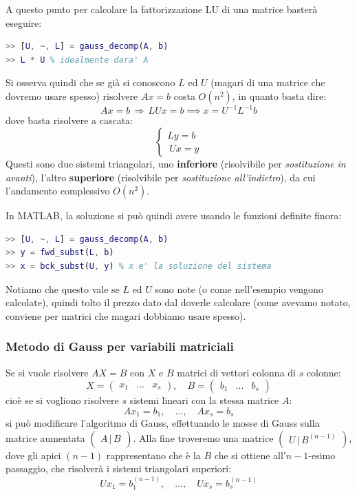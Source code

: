 \documentclass[a4paper,11pt]{article}
\begin{document}
A questo punto per calcolare la fattorizzazione LU di una matrice basterà eseguire:
\begin{lstlisting}[language=matlab, style=codestyle]	
>> [U, ~, L] = gauss_decomp(A, b)
>> L * U % idealmente dara' A
\end{lstlisting}
\par\smallskip

Si osserva quindi che se già si conoscono $L$ ed $U$ (magari di una matrice che dovremo usare spesso) risolvere $Ax = b$ costa $O(n^2)$, in quanto basta dire:
$$
Ax = b \, \Rightarrow \, LUx = b \implies x = U^{-1} L^{-1} b
$$
dove basta risolvere a cascata:
\[
	\begin{cases}
		Ly = b \\\
		Ux = y
	\end{cases}
\]
Questi sono due sistemi triangolari, uno \textbf{inferiore} (risolvibile per \textit{sostituzione in avanti}), l'altro \textbf{superiore} (risolvibile per \textit{sostituzione all'indietro}), da cui l'andamento complessivo $O(n^2)$.

In MATLAB, la soluzione si può quindi avere usando le funzioni definite finora:
\begin{lstlisting}[language=matlab, style=codestyle]	
>> [U, ~, L] = gauss_decomp(A, b)
>> y = fwd_subst(L, b)
>> x = bck_subst(U, y) % x e' la soluzione del sistema
\end{lstlisting}

Notiamo che questo vale se $L$ ed $U$ sono note (o come nell'esempio vengono calcolate), quindi tolto il prezzo dato dal doverle calcolare (come avevamo notato, conviene per matrici che magari dobbiamo usare spesso).

\subsubsection{Metodo di Gauss per variabili matriciali}
Se si vuole risolvere $AX = B$ con $X$ e $B$ matrici di vettori colonna di $s$ colonne:
$$
X = \begin{pmatrix}
	x_1 & ... & x_s
\end{pmatrix}, \quad
B = \begin{pmatrix}
	b_1 & ... & b_s
\end{pmatrix}
$$
cioè se si vogliono risolvere $s$ sistemi lineari con la stessa matrice $A$:
$$
Ax_1 = b_1, \quad ..., \quad Ax_s = b_s
$$
si può modificare l'algoritmo di Gauss, effettuando le mosse di Gauss sulla matrice aumentata $\begin{pmatrix}
	A \, | \, B
\end{pmatrix}$.
Alla fine troveremo una matrice $\begin{pmatrix}
	U \, | \, B^{(n - 1)}
\end{pmatrix}$, dove gli apici $(n - 1)$ rappresentano che è la $B$ che si ottiene all'$n-1$-esimo passaggio, che risolverà i sistemi triangolari superiori:
$$
Ux_1 = b_1^{(n - 1)}, \quad ..., \quad Ux_s = b_s^{(n - 1)}
$$
\end{document}
